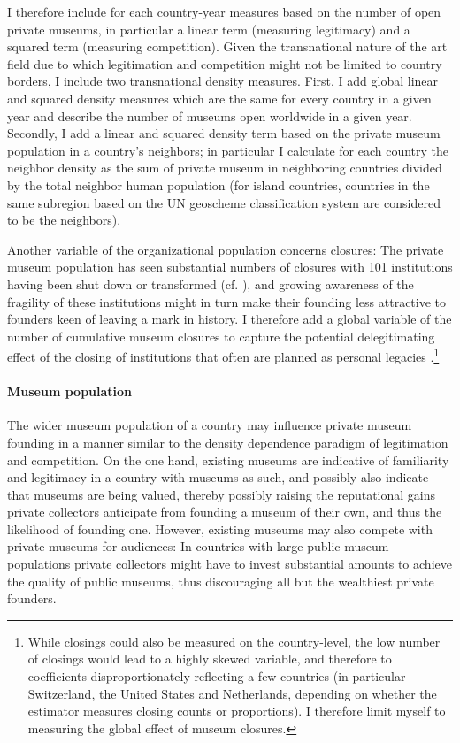 \documentclass[11pt, authoryear]{elsarticle}
\begin{document}
I therefore include for each country-year measures based on the number of open private museums, in particular a linear term (measuring legitimacy) and a squared term (measuring competition).
Given the transnational nature of the art field due to which legitimation and competition might not be limited to country borders, I include two transnational density measures.
First, I add global linear and squared density measures which are the same for every country in a given year and describe the number of museums open worldwide in a given year.
Secondly, I add a linear and squared density term based on the private museum population in a country's neighbors; in particular I calculate for each country the neighbor density as the sum of private museum in neighboring countries divided by the total neighbor human population (for island countries, countries in the same subregion based on the UN geoscheme classification system are considered to be the neighbors). 


Another variable of the organizational population concerns closures:
The private museum population has seen substantial numbers of closures with 101 institutions having been shut down or transformed (cf. \citealt{Velthuis_Gera_2024_fragility}), and growing awareness of the fragility of these institutions might in turn make their founding less attractive to founders keen of leaving a mark in history.
I therefore add a global variable of the number of cumulative museum closures to capture the potential delegitimating effect of the closing of institutions that often are planned as personal legacies \citep{Walker_2019_collector}.\footnote{While closings could also be measured on the country-level, the low number of closings would lead to a highly skewed variable, and therefore to coefficients disproportionately reflecting a few countries (in particular Switzerland, the United States and Netherlands, depending on whether the estimator measures closing counts or proportions). I therefore limit myself to measuring the global effect of museum closures.} 




\paragraph*{Museum population}


The wider museum population of a country may influence private museum founding in a manner similar to the density dependence paradigm of legitimation and competition.
On the one hand, existing museums are indicative of familiarity and legitimacy in a country with museums as such, and possibly also indicate that museums are being valued, thereby possibly raising the reputational gains private collectors anticipate from founding a museum of their own, and thus the likelihood of founding one.
However, existing museums may also compete with private museums for audiences:
In countries with large public museum populations private collectors might have to invest substantial amounts to achieve the quality of public museums, thus discouraging all but the wealthiest private founders.
\end{document}
